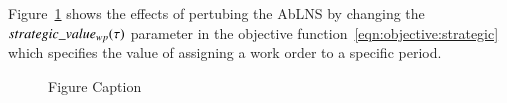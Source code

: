 Figure~\ref{fig:responses:value_change} shows the effects of
pertubing the AbLNS by changing the $strategic\_value_{w p}(\tau)$ parameter in the objective
function~\ref{eqn:objective:strategic} which specifies the value of assigning a
work order to a specific period.

\begin{figure}[H]%
	\centering
	\resizebox{\linewidth}{!}{
		
	}
	\caption{Figure Caption}
	\label{fig:responses:value_change}
\end{figure}
 
